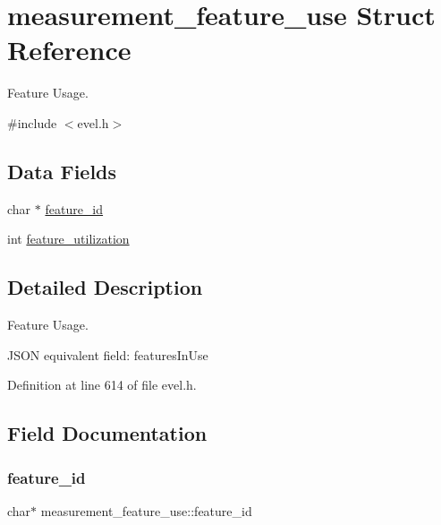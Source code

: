 \hypertarget{structmeasurement__feature__use}{}\section{measurement\+\_\+feature\+\_\+use Struct Reference}
\label{structmeasurement__feature__use}


Feature Usage.  




{\ttfamily \#include $<$evel.\+h$>$}

\subsection*{Data Fields}
\begin{DoxyCompactItemize}
\item 
char $\ast$ \hyperlink{structmeasurement__feature__use_aab070c5ff1a041e0cd424f2cee8d354b}{feature\+\_\+id}
\item 
int \hyperlink{structmeasurement__feature__use_acfc02a6d8e005960701eca4389e5c222}{feature\+\_\+utilization}
\end{DoxyCompactItemize}


\subsection{Detailed Description}
Feature Usage. 

J\+S\+ON equivalent field\+: features\+In\+Use 

Definition at line 614 of file evel.\+h.



\subsection{Field Documentation}
\hypertarget{structmeasurement__feature__use_aab070c5ff1a041e0cd424f2cee8d354b}{}\label{structmeasurement__feature__use_aab070c5ff1a041e0cd424f2cee8d354b} 
\subsubsection{\texorpdfstring{feature\+\_\+id}{feature\_id}}
{\footnotesize\ttfamily char$\ast$ measurement\+\_\+feature\+\_\+use\+::feature\+\_\+id}



